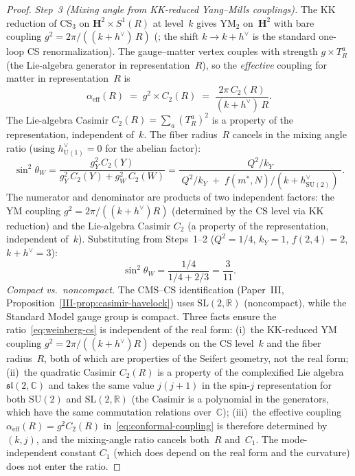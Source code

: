 \begin{proof}
\emph{Step~3 (Mixing angle from KK-reduced Yang--Mills couplings).}
The KK reduction of $\mathrm{CS}_3$ on $\mathbf{H}^2 \times S^1(R)$
at level~$k$ gives $\mathrm{YM}_2$ on~$\mathbf{H}^2$
with bare coupling $g^2 = 2\pi/((k{+}h^\vee)\,R)$
(\citealt{BlauThompson1993}; the shift $k \to k{+}h^\vee$
is the standard one-loop CS renormalization).
The gauge--matter vertex couples with strength $g \times T^a_R$
(the Lie-algebra generator in representation~$R$),
so the \emph{effective} coupling for matter in representation~$R$ is
\begin{equation}\label{eq:conformal-coupling}
  \alpha_{\mathrm{eff}}(R)
  \;=\; g^2 \times C_2(R)
  \;=\; \frac{2\pi\,C_2(R)}{(k{+}h^\vee)\,R}.
\end{equation}
The Lie-algebra Casimir $C_2(R) = \sum_a (T^a_R)^2$ is a property
of the representation, independent of~$k$.
The fiber radius~$R$ cancels in the mixing angle ratio
(using $h^\vee_{\mathrm{U}(1)} = 0$ for the abelian factor):
\begin{equation}\label{eq:weinberg-cs}
  \sin^2\theta_W
  = \frac{g_Y^2\,C_2(Y)}{g_Y^2\,C_2(Y) + g_W^2\,C_2(W)}
  = \frac{Q^2/k_Y}{\;Q^2/k_Y \;+\; f(m^*,N)/(k{+}h^\vee_{\mathrm{SU}(2)})\;}.
\end{equation}
The numerator and denominator are products of two
independent factors: the YM coupling $g^2 = 2\pi/((k{+}h^\vee)R)$
(determined by the CS level via KK reduction) and the
Lie-algebra Casimir $C_2$ (a property of the representation,
independent of~$k$).
Substituting from Steps~1--2
($Q^2 = 1/4$, $k_Y = 1$, $f(2,4) = 2$, $k{+}h^\vee = 3$):
\[
  \sin^2\theta_W
  = \frac{1/4}{1/4 + 2/3}
  = \frac{3}{11}.
\]
\emph{Compact vs.\ noncompact.}
The CMS--CS identification (Paper~III,
Proposition~\ref*{III-prop:casimir-havelock}) uses
$\mathrm{SL}(2,\mathbb{R})$ (noncompact), while the Standard
Model gauge group is compact.
Three facts ensure the ratio~\eqref{eq:weinberg-cs} is
independent of the real form:
(i)~the KK-reduced YM coupling $g^2 = 2\pi/((k{+}h^\vee)R)$
depends on the CS level~$k$ and the fiber radius~$R$, both
of which are properties of the Seifert geometry, not the
real form;
(ii)~the quadratic Casimir $C_2(R)$ is a property of the
complexified Lie algebra $\mathfrak{sl}(2,\mathbb{C})$ and
takes the same value $j(j{+}1)$ in the spin-$j$ representation
for both $\mathrm{SU}(2)$ and $\mathrm{SL}(2,\mathbb{R})$
(the Casimir is a polynomial in the generators, which have
the same commutation relations over~$\mathbb{C}$);
(iii)~the effective coupling $\alpha_{\mathrm{eff}}(R)
= g^2 C_2(R)$ in~\eqref{eq:conformal-coupling} is therefore
determined by $(k, j)$, and the mixing-angle
ratio cancels both~$R$ and~$C_1$.
The mode-independent constant $C_1$ (which does depend on
the real form and the curvature) does not enter the ratio.
\end{proof}

